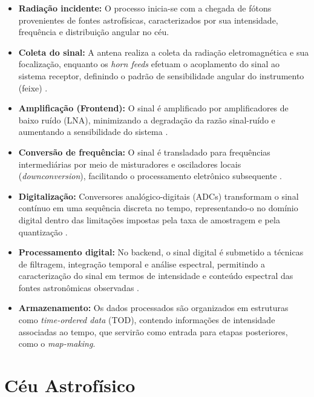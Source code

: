 \begin{itemize}
    \item \textbf{Radiação incidente:} O processo inicia-se com a chegada de fótons provenientes de fontes astrofísicas, caracterizados por sua intensidade, frequência e distribuição angular no céu.
    \item \textbf{Coleta do sinal:} A antena realiza a coleta da radiação eletromagnética e sua focalização, enquanto os \textit{horn feeds} efetuam o acoplamento do sinal ao sistema receptor, definindo o padrão de sensibilidade angular do instrumento (feixe) \cite{Souza2024}.
    \item \textbf{Amplificação (Frontend):} O sinal é amplificado por amplificadores de baixo ruído (LNA), minimizando a degradação da razão sinal-ruído e aumentando a sensibilidade do sistema \cite{ramalho2023impactos}.
    \item \textbf{Conversão de frequência:} O sinal é transladado para frequências intermediárias por meio de misturadores e osciladores locais (\textit{downconversion}), facilitando o processamento eletrônico subsequente \cite{Azevedo2018}.
    \item \textbf{Digitalização:} Conversores analógico-digitais (ADCs) transformam o sinal contínuo em uma sequência discreta no tempo, representando-o no domínio digital dentro das limitações impostas pela taxa de amostragem e pela quantização \cite{ramalho2023impactos}.
    \item \textbf{Processamento digital:} No backend, o sinal digital é submetido a técnicas de filtragem, integração temporal e análise espectral, permitindo a caracterização do sinal em termos de intensidade e conteúdo espectral das fontes astronômicas observadas \cite{ramalho2023impactos}.
    \item \textbf{Armazenamento:} Os dados processados são organizados em estruturas como \textit{time-ordered data} (TOD), contendo informações de intensidade associadas ao tempo, que servirão como entrada para etapas posteriores, como o \textit{map-making}. \end{itemize}
    \section{Céu Astrofísico}

